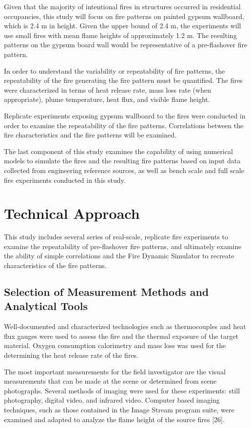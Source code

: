 \documentclass[twoside]{uocthesis}
\begin{document}
Given that the majority of intentional fires in structures occurred in residential occupancies, this study will focus on fire patterns on painted gypsum wallboard, which is 2.4 m in height.  Given the upper bound of 2.4 m, the experiments will use small fires with mean flame heights of approximately 1.2 m.  The resulting patterns on the gypsum board wall would be representative of a pre-flashover fire pattern. 
   
In order to understand the variability or repeatability of fire patterns, the repeatability of the fire generating the fire pattern must be quantified.  The fires were characterized in terms of heat release rate, mass loss rate (when appropriate), plume temperature, heat flux, and visible flame height. 
      
Replicate experiments exposing gypsum wallboard to the fires were conducted in order to examine the repeatability of the fire patterns.  Correlations between the fire characteristics and the fire patterns will be examined.

The last component of this study examines the capability of using numerical models to simulate the fires and the resulting fire patterns based on input data collected from engineering reference sources, as well as  bench scale and full scale fire experiments conducted in this study.

\chapter{Technical Approach}

This study includes several series of real-scale, replicate fire experiments to examine the repeatability of pre-flashover fire patterns, and ultimately examine the ability of simple correlations and the Fire Dynamic Simulator to recreate characteristics of the fire patterns. 
 
\section{Selection of Measurement Methods and Analytical Tools}

Well-documented and characterized technologies such as thermocouples and heat flux gauges were used to assess the fire and the thermal exposure of the target material.  Oxygen consumption calorimetry and mass loss was used for the determining the heat release rate of the fires.
   
The most important measurements for the field investigator are the visual measurements that can be made at the scene or determined from scene photographs. Several methods of imaging were used for these experiments: still photography, digital video, and infrared video.  Computer based imaging techniques, such as those contained in the Image Stream program suite, were examined and adapted to analyze the flame height of the source fires [26]. 
\end{document}
